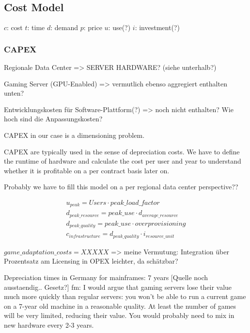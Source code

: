 \subsection{Cost Model}



$c$: cost
$t$: time
$d$: demand
$p$: price
$u$: use(?)
$i$: investment(?)

\subsubsection{CAPEX}

Regionale Data Center => SERVER HARDWARE? (siehe unterhalb?)

Gaming Server (GPU-Enabled) => vermutlich ebenso aggregiert enthalten unten?

Entwicklungskosten für Software-Plattform(?) => noch nicht enthalten? Wie hoch sind die Anpassungskosten?

CAPEX in our case is a dimensioning problem.

CAPEX are typically used in the sense of depreciation costs. We have to define the runtime of hardware and calculate the cost per user and year to understand whether it is profitable on a per contract basis later on.

Probably we have to fill this model on a per regional data center perspective??

\begin{align*}
u_{peak} = Users \cdot peak\_load\_factor \\
d_{peak\_resource} = peak\_use \cdot d_{average\_resource} \\
d_{peak\_quality} = peak\_use \cdot overprovisioning \\
c_{infrastructure} = d_{peak\_quality} \cdot i_{resource\_unit}
\end{align*}

$game\_adaptation\_costs = XXXXX$ => meine Vermutung: Integration über Prozentsatz am Licensing in OPEX leichter, da schätzbar?

Depreciation times in Germany for mainframes: 7 years [Quelle noch ausstaendig.. Gesetz?]
fm: I would argue that gaming servers lose their value much more quickly than regular servers: you won't be able to run a current game on a 7-year old machine in a reasonable quality. At least the number of games will be very limited, reducing their value. 
You would probably need to mix in new hardware every 2-3 years.

